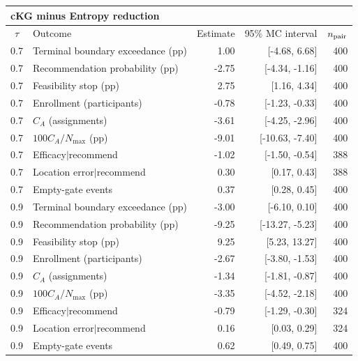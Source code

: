 \begin{tabular}{@{}clrrr@{}}
\multicolumn{5}{l}{\textbf{cKG minus Entropy reduction}} \\
\toprule
$\tau$ & Outcome & Estimate & 95\% MC interval & $n_{\rm pair}$ \\
\midrule
0.7 & Terminal boundary exceedance (pp) & 1.00 & [-4.68, 6.68] & 400 \\
0.7 & Recommendation probability (pp) & -2.75 & [-4.34, -1.16] & 400 \\
0.7 & Feasibility stop (pp) & 2.75 & [1.16, 4.34] & 400 \\
0.7 & Enrollment (participants) & -0.78 & [-1.23, -0.33] & 400 \\
0.7 & $C_A$ (assignments) & -3.61 & [-4.25, -2.96] & 400 \\
0.7 & $100C_A/N_{\max}$ (pp) & -9.01 & [-10.63, -7.40] & 400 \\
0.7 & Efficacy$\mid$recommend & -1.02 & [-1.50, -0.54] & 388 \\
0.7 & Location error$\mid$recommend & 0.30 & [0.17, 0.43] & 388 \\
0.7 & Empty-gate events & 0.37 & [0.28, 0.45] & 400 \\
0.9 & Terminal boundary exceedance (pp) & -3.00 & [-6.10, 0.10] & 400 \\
0.9 & Recommendation probability (pp) & -9.25 & [-13.27, -5.23] & 400 \\
0.9 & Feasibility stop (pp) & 9.25 & [5.23, 13.27] & 400 \\
0.9 & Enrollment (participants) & -2.67 & [-3.80, -1.53] & 400 \\
0.9 & $C_A$ (assignments) & -1.34 & [-1.81, -0.87] & 400 \\
0.9 & $100C_A/N_{\max}$ (pp) & -3.35 & [-4.52, -2.18] & 400 \\
0.9 & Efficacy$\mid$recommend & -0.79 & [-1.29, -0.30] & 324 \\
0.9 & Location error$\mid$recommend & 0.16 & [0.03, 0.29] & 324 \\
0.9 & Empty-gate events & 0.62 & [0.49, 0.75] & 400 \\
\bottomrule
\end{tabular}
\smallskip
